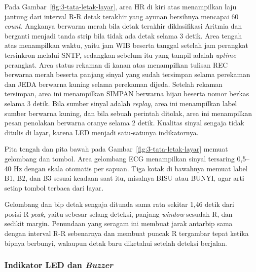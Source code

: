 Pada Gambar~\ref{fig:3-tata-letak-layar}, area HR di kiri atas menampilkan laju jantung dari interval R-R detak terakhir yang ayunan bersihnya mencapai 60 \textit{count}. Angkanya berwarna merah bila detak terakhir diklasifikasi Aritmia dan berganti menjadi tanda strip bila tidak ada detak selama 3 detik. Area tengah atas menampilkan waktu, yaitu jam WIB beserta tanggal setelah jam perangkat tersinkron melalui SNTP, sedangkan sebelum itu yang tampil adalah \textit{uptime} perangkat. Area status rekaman di kanan atas menampilkan tulisan REC berwarna merah beserta panjang sinyal yang sudah tersimpan selama perekaman dan JEDA berwarna kuning selama perekaman dijeda. Setelah rekaman tersimpan, area ini menampilkan SIMPAN berwarna hijau beserta nomor berkas selama 3 detik. Bila sumber sinyal adalah \textit{replay}, area ini menampilkan label sumber berwarna kuning, dan bila sebuah perintah ditolak, area ini menampilkan pesan penolakan berwarna oranye selama 2 detik. Kualitas sinyal sengaja tidak ditulis di layar, karena LED menjadi satu-satunya indikatornya.

Pita tengah dan pita bawah pada Gambar~\ref{fig:3-tata-letak-layar} memuat gelombang dan tombol. Area gelombang ECG menampilkan sinyal tersaring 0,5--40 Hz dengan skala otomatis per sapuan. Tiga kotak di bawahnya memuat label B1, B2, dan B3 sesuai keadaan saat itu, misalnya BISU atau BUNYI, agar arti setiap tombol terbaca dari layar.

Gelombang dan bip detak sengaja ditunda sama rata sekitar 1,46 detik dari posisi R-\textit{peak}, yaitu sebesar selang deteksi, panjang \textit{window} sesudah R, dan sedikit margin. Penundaan yang seragam ini membuat jarak antarbip sama dengan interval R-R sebenarnya dan membuat puncak R tergambar tepat ketika bipnya berbunyi, walaupun detak baru diketahui setelah deteksi berjalan.

\subsubsection{Indikator LED dan \textit{Buzzer}}


